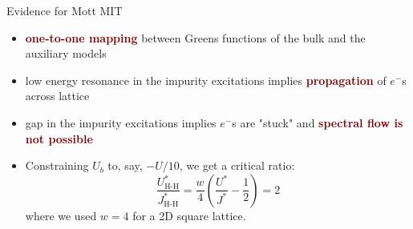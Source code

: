 \documentclass[aspectratio=169]{beamer}
\newcommand{\focus}[1]{\textcolor{maroon}{\textbf{#1}}}
\begin{document}
\begin{frame}[noframenumbering]{Evidence for Mott MIT}
\begin{itemize}[<+->]
	\item \focus{one-to-one mapping} between Greens functions of the bulk and the auxiliary models
	\item low energy resonance in the impurity excitations implies \focus{propagation} of $e^{-}$s across lattice
	\item gap in the impurity excitations implies $e^{-}$s are "stuck" and \focus{spectral flow is not possible}
	\item Constraining \(U_b\) to, say, \(-U/10\), we get a critical ratio:
		\[\frac{U_\text{H-H}^*}{J^*_\text{H-H}} = \frac{w}{4}\left(\frac{U^*}{J^*} - \frac{1}{2}\right) = 2\]
		where we used \(w=4\) for a  2D square lattice.
\end{itemize}
\vspace*{-40pt}
\end{frame}
\end{document}
